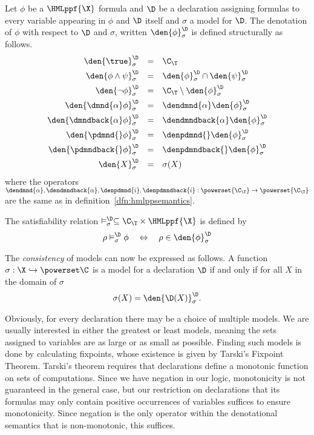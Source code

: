 \begin{definition}
    \label{dfn:hmlppfsemantics}

    Let $\phi$ be a $\HMLppf{\X}$ formula and $\D$ be a declaration assigning
    formulas to every variable appearing in $\phi$ and $\D$ itself and
    $\sigma$ a model for $\D$. 
    The denotation of $\phi$ with respect to $\D$ and $\sigma$,
    written $\den{\phi}^\D_\sigma$
    is defined structurally as follows.
    \[
    \begin{array}{r@{\quad}c@{\quad}l}
        \den{\true}^\D_\sigma &=&  \C_\T \\[4pt]
        \den{\phi\land\psi}^\D_\sigma &=& \den{\phi}^\D_\sigma \cap \den{\psi}^\D_\sigma \\[4pt]
        \den{\neg\phi}^\D_\sigma &=& \C_\T \setminus \den{\phi}^\D_\sigma \\[4pt]
        \den{\dmnd{\alpha}\phi}^\D_\sigma &=& \dendmnd{\alpha}\den{\phi}^\D_\sigma \\[4pt]
        \den{\dmndback{\alpha}\phi}^\D_\sigma &=& \dendmndback{\alpha}\den{\phi}^\D_\sigma \\[4pt]
        \den{\pdmnd{}\phi}^\D_\sigma &=& \denpdmnd{}\den{\phi}^\D_\sigma \\[4pt]
        \den{\pdmndback{}\phi}^\D_\sigma &=& \denpdmndback{}\den{\phi}^\D_\sigma \\[4pt]
        \den{X}^\D_\sigma &=& \sigma(X) \\
    \end{array}
    \]
    where the operators $\dendmnd{\alpha}, \dendmndback{\alpha},
    \denpdmnd{i}, \denpdmndback{i} : \powerset{\C_\T} \rightarrow \powerset{\C_\T}$
    are the same as in definition~\ref{dfn:hmlppsemantics}.

    The satisfiability relation $\vDash^\D_\sigma \subseteq \C_\T \times \HMLppf{\X}$
    is defined by
    \[
        \rho \vDash^\D_\sigma \phi  \quad\Leftrightarrow\quad \rho \in \den{\phi}^\D_\sigma
    \]
\end{definition}

The {\em consistency} of models can now be expressed as follows. A function 
$\sigma : \X \hookrightarrow \powerset\C$ is a model for a declaration $\D$
if and only if for all $X$ in the domain of $\sigma$
\[
\sigma(X) = \den{\D(X)}_\sigma^\D.
\]

Obviously, for every declaration there may be a choice of multiple models. 
We are usually interested in either the greatest or least models, meaning the
sets assigned to variables are as large or as small as possible. Finding such
models is done by calculating fixpoints, whose existence is given by Tarski's
Fixpoint Theorem. Tarski's theorem requires that declarations define
a monotonic function on sets of computations. Since we have negation in our logic,
monotonicity is not guaranteed in the general case, but our restriction on
declarations that its formulas may only contain positive occurrences of variables
suffices to ensure monotonicity.
Since negation is the only operator within the
denotational semantics that is non-monotonic, this suffices.

